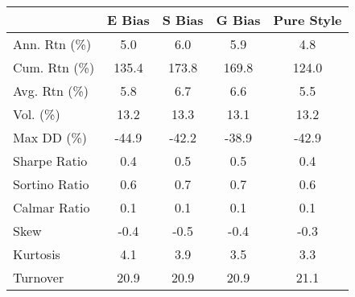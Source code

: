 \begin{tabular}{lcccc}
\toprule
 & E Bias & S Bias & G Bias & Pure Style \\
\midrule
Ann. Rtn (\%) & 5.0 & 6.0 & 5.9 & 4.8 \\
Cum. Rtn (\%) & 135.4 & 173.8 & 169.8 & 124.0 \\
Avg. Rtn (\%) & 5.8 & 6.7 & 6.6 & 5.5 \\
Vol. (\%) & 13.2 & 13.3 & 13.1 & 13.2 \\
Max DD (\%) & -44.9 & -42.2 & -38.9 & -42.9 \\
Sharpe Ratio & 0.4 & 0.5 & 0.5 & 0.4 \\
Sortino Ratio & 0.6 & 0.7 & 0.7 & 0.6 \\
Calmar Ratio & 0.1 & 0.1 & 0.1 & 0.1 \\
Skew & -0.4 & -0.5 & -0.4 & -0.3 \\
Kurtosis & 4.1 & 3.9 & 3.5 & 3.3 \\
Turnover & 20.9 & 20.9 & 20.9 & 21.1 \\
\bottomrule
\end{tabular}
